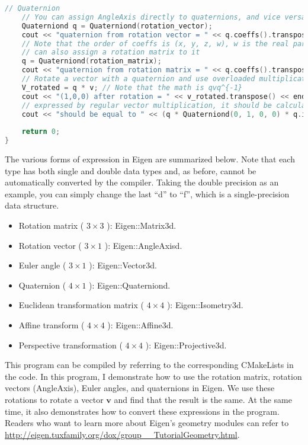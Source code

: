 \begin{lstlisting}[language=c++,caption=slambook2/ch3/useGeometry/useGeometry.cpp]
	// Quaternion
	// You can assign AngleAxis directly to quaternions, and vice versa
	Quaterniond q = Quaterniond(rotation_vector);
	cout << "quaternion from rotation vector = " << q.coeffs().transpose() << endl; 
	// Note that the order of coeffs is (x, y, z, w), w is the real part, the first three are the imaginary part
	// can also assign a rotation matrix to it
	q = Quaterniond(rotation_matrix);
	cout << "quaternion from rotation matrix = " << q.coeffs().transpose() << endl;
	// Rotate a vector with a quaternion and use overloaded multiplication
	V_rotated = q * v; // Note that the math is qvq^{-1}
	cout << "(1,0,0) after rotation = " << v_rotated.transpose() << endl;
	// expressed by regular vector multiplication, it should be calculated as follows
	cout << "should be equal to " << (q * Quaterniond(0, 1, 0, 0) * q.inverse()).coeffs().transpose() << endl;
	
	return 0;
}
\end{lstlisting}

The various forms of expression in Eigen are summarized below. Note that each type has both single and double data types and, as before, cannot be automatically converted by the compiler. Taking the double precision as an example, you can simply change the last ``d'' to ``f'', which is a single-precision data structure.
\begin{itemize}
	\item Rotation matrix ( $ 3  \times  3 $ ): Eigen::Matrix3d.
	\item Rotation vector ( $ 3  \times  1 $ ): Eigen::AngleAxisd.
	\item Euler angle ( $ 3  \times  1 $ ): Eigen::Vector3d.
	\item Quaternion ( $ 4  \times  1 $ ): Eigen::Quaterniond.
	\item Euclidean transformation matrix ( $ 4  \times  4 $ ): Eigen::Isometry3d.
	\item Affine transform ( $ 4  \times  4 $ ): Eigen::Affine3d.
	\item Perspective transformation ( $ 4  \times  4 $ ): Eigen::Projective3d.
\end{itemize}

This program can be compiled by referring to the corresponding CMakeLists in the code. In this program, I demonstrate how to use the rotation matrix, rotation vectors (AngleAxis), Euler angles, and quaternions in Eigen. We use these rotations to rotate a vector $ \mathbf {v} $ and find that the result is the same. At the same time, it also demonstrates how to convert these expressions in the program. Readers who want to learn more about Eigen's geometry modules can refer to \url {http://eigen.tuxfamily.org/dox/group__TutorialGeometry.html}.

